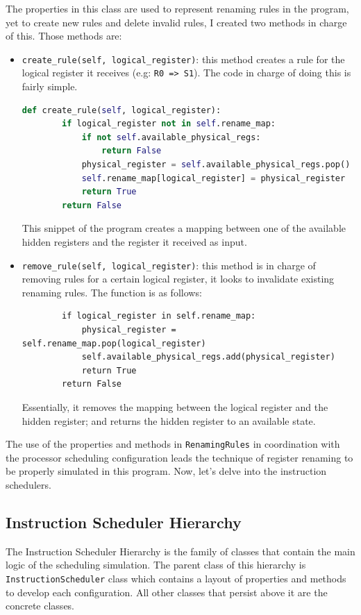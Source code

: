 \documentclass{article}
\begin{document}
The properties in this class are used to represent renaming rules in the program, yet to create new rules and delete invalid rules, I created two methods in charge of this. Those methods are:

\begin{itemize}
    \item \lstinline|create_rule(self, logical_register)|: this method creates a rule for the logical register it receives (e.g: \lstinline|R0 => S1|). The code in charge of doing this is fairly simple. 
\begin{lstlisting}[language=Python]
    def create_rule(self, logical_register):
        if logical_register not in self.rename_map:
            if not self.available_physical_regs:
                return False 
            physical_register = self.available_physical_regs.pop() 
            self.rename_map[logical_register] = physical_register
            return True
        return False
\end{lstlisting}
    This snippet of the program creates a mapping between one of the available hidden registers and the register it received as input. 
    \item \lstinline|remove_rule(self, logical_register)|: this method is in charge of removing rules for a certain logical register, it looks to invalidate existing renaming rules. The function is as follows:
\begin{lstlisting}
        if logical_register in self.rename_map:
            physical_register = self.rename_map.pop(logical_register)
            self.available_physical_regs.add(physical_register) 
            return True
        return False
\end{lstlisting}
    Essentially, it removes the mapping between the logical register and the hidden register; and returns the hidden register to an available state. 
\end{itemize}

The use of the properties and methods in \lstinline|RenamingRules| in coordination with the processor scheduling configuration leads the technique of register renaming to be properly simulated in this program. Now, let's delve into the instruction schedulers.

\subsection{Instruction Scheduler Hierarchy}
The Instruction Scheduler Hierarchy is the family of classes that contain the main logic of the scheduling simulation. The parent class of this hierarchy is \lstinline|InstructionScheduler| class which contains a layout of properties and methods to develop each configuration. All other classes that persist above it are the concrete classes.
\end{document}
